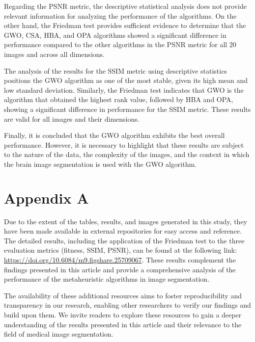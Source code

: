 \documentclass{elsarticle}
\begin{document}
\noindent Regarding the PSNR metric, the descriptive statistical analysis does not provide relevant information for analyzing the performance of the algorithms. On the other hand, the Friedman test provides sufficient evidence to determine that the GWO, CSA, HBA, and OPA algorithms showed a significant difference in performance compared to the other algorithms in the PSNR metric for all 20 images and across all dimensions.

\noindent The analysis of the results for the SSIM metric using descriptive statistics positions the GWO algorithm as one of the most stable, given its high mean and low standard deviation. Similarly, the Friedman test indicates that GWO is the algorithm that obtained the highest rank value, followed by HBA and OPA, showing a significant difference in performance for the SSIM metric. These results are valid for all images and their dimensions.

\noindent Finally, it is concluded that the GWO algorithm exhibits the best overall performance. However, it is necessary to highlight that these results are subject to the nature of the data, the complexity of the images, and the context in which the brain image segmentation is used with the GWO algorithm.

\section{Appendix A}
\label{sec:appendix}
\noindent Due to the extent of the tables, results, and images generated in this study, they have been made available in external repositories for easy access and reference. The detailed results, including the application of the Friedman test to the three evaluation metrics (fitness, SSIM, PSNR), can be found at the following link: \url{https://doi.org/10.6084/m9.figshare.25709067}. These results complement the findings presented in this article and provide a comprehensive analysis of the performance of the metaheuristic algorithms in image segmentation.

\noindent The availability of these additional resources aims to foster reproducibility and transparency in our research, enabling other researchers to verify our findings and build upon them. We invite readers to explore these resources to gain a deeper understanding of the results presented in this article and their relevance to the field of medical image segmentation.


\end{document}
